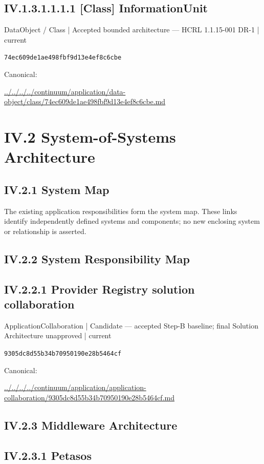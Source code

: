 \documentclass[10pt,a4paper]{article}
\begin{document}
\subsection*{IV.1.3.1.1.1.1 [Class] InformationUnit}
\label{element-74ec609de1ae498fbf9d13e4ef8c6cbe}
{\small DataObject / Class | Accepted bounded architecture — HCRL 1.1.15-001 DR-1 | current}\par
\texttt{74ec609de1ae498fbf9d13e4ef8c6cbe}\par
Canonical: \par
{\footnotesize\url{../../../../continuum/application/data-object/class/74ec609de1ae498fbf9d13e4ef8c6cbe.md}}\par
\section*{IV.2 System-of-Systems Architecture}
\subsection*{IV.2.1 System Map}
The existing application responsibilities form the system map. These links identify independently defined systems and components; no new enclosing system or relationship is asserted.\par
\subsection*{IV.2.2 System Responsibility Map}
\subsection*{IV.2.2.1 Provider Registry solution collaboration}
\label{element-9305dc8d55b34b70950190e28b5464cf}
{\small ApplicationCollaboration | Candidate — accepted Step-B baseline; final Solution Architecture unapproved | current}\par
\texttt{9305dc8d55b34b70950190e28b5464cf}\par
Canonical: \par
{\footnotesize\url{../../../../continuum/application/application-collaboration/9305dc8d55b34b70950190e28b5464cf.md}}\par
\subsection*{IV.2.3 Middleware Architecture}
\subsection*{IV.2.3.1 Petasos}
\end{document}
